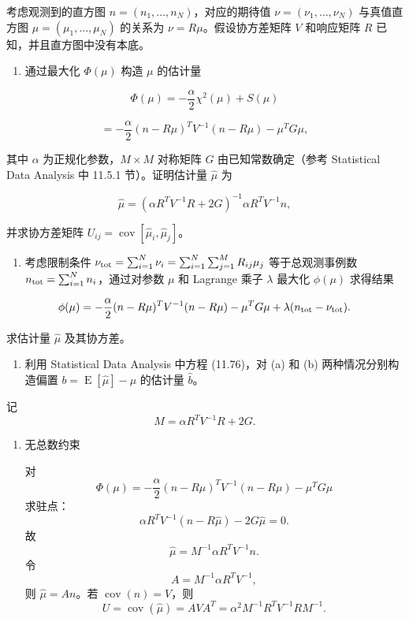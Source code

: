 \begin{question}
考虑观测到的直方图 \(n=(n_1,\ldots,n_N)\)，对应的期待值
\(\nu=(\nu_1,\ldots,\nu_N)\) 与真值直方图 \(\mu=(\mu_1,\ldots,\mu_N)\)
的关系为 \(\nu=R\mu\)。假设协方差矩阵 \(V\) 和响应矩阵 \(R\)
已知，并且直方图中没有本底。

\begin{enumerate}
\item
  通过最大化 \(\Phi(\mu)\) 构造 \(\mu\) 的估计量
\end{enumerate}

\[
\Phi(\mu)=-\frac{\alpha}{2}\chi^2(\mu)+S(\mu)
\]

\[
=-\frac{\alpha}{2}(n-R\mu)^T V^{-1}(n-R\mu)-\mu^T G\mu,
\]

其中 \(\alpha\) 为正规化参数，\(M\times M\) 对称矩阵 \(G\)
由已知常数确定（参考 Statistical Data Analysis 中 11.5.1
节）。证明估计量 \(\hat\mu\) 为

\[
\hat\mu=(\alpha R^T V^{-1}R+2G)^{-1}\alpha R^T V^{-1}n,
\]

并求协方差矩阵 \(U_{ij}=\operatorname{cov}[\hat\mu_i,\hat\mu_j]\)。

\begin{enumerate}[start=2]
\item
  考虑限制条件
  \(\nu_{\rm tot}=\sum_{i=1}^{N}\nu_i=\sum_{i=1}^{N}\sum_{j=1}^{M}R_{ij}\mu_j\)
  等于总观测事例数 \(n_{\rm tot}=\sum_{i=1}^{N}n_i\)，通过对参数 \(\mu\)
  和 Lagrange 乘子 \(\lambda\) 最大化 \(\phi(\mu)\) 求得结果
\end{enumerate}

\[
\phi(\mu)=-\frac{\alpha}{2}(n-R\mu)^T V^{-1}(n-R\mu)-\mu^T G\mu+\lambda(n_{\rm tot}-\nu_{\rm tot}).
\]

求估计量 \(\hat\mu\) 及其协方差。

\begin{enumerate}[start=3]
\item
  利用 Statistical Data Analysis 中方程 (11.76)，对 (a) 和 (b)
  两种情况分别构造偏置 \(b=\operatorname{E}[\hat\mu]-\mu\) 的估计量 \(\hat b\)。
\end{enumerate}
\begin{solution}
记
\[
M=\alpha R^T V^{-1}R+2G.
\]

\begin{enumerate}
\item 无总数约束

对
\[
\Phi(\mu)=
-\frac\alpha2(n-R\mu)^TV^{-1}(n-R\mu)-\mu^TG\mu
\]
求驻点：
\[
\alpha R^TV^{-1}(n-R\hat\mu)-2G\hat\mu=0.
\]
故
\[
\hat\mu=M^{-1}\alpha R^TV^{-1}n.
\]
令
\[
A=M^{-1}\alpha R^TV^{-1},
\]
则 \(\hat\mu=An\)。若 \(\operatorname{cov}(n)=V\)，则
\[
U=\operatorname{cov}(\hat\mu)=AVA^T
=\alpha^2M^{-1}R^TV^{-1}R M^{-1}.
\]


\end{enumerate}
\end{solution}
\end{question}

